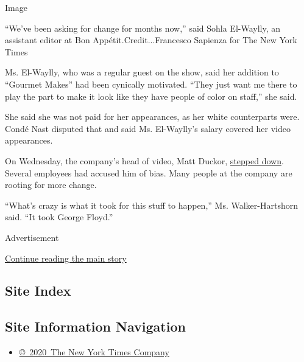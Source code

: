Image

``We've been asking for change for months now,'' said Sohla El-Waylly,
an assistant editor at Bon Appétit.Credit...Francesco Sapienza for The
New York Times

Ms. El-Waylly, who was a regular guest on the show, said her addition to
``Gourmet Makes'' had been cynically motivated. ``They just want me
there to play the part to make it look like they have people of color on
staff,'' she said.

She said she was not paid for her appearances, as her white counterparts
were. Condé Nast disputed that and said Ms. El-Waylly's salary covered
her video appearances.

On Wednesday, the company's head of video, Matt Duckor,
\href{https://www.nytimes3xbfgragh.onion/2020/06/10/business/conde-nast-matt-duckor.html}{stepped
down}. Several employees had accused him of bias. Many people at the
company are rooting for more change.

``What's crazy is what it took for this stuff to happen,'' Ms.
Walker-Hartshorn said. ``It took George Floyd.''

Advertisement

\protect\hyperlink{after-bottom}{Continue reading the main story}

\hypertarget{site-index}{%
\subsection{Site Index}\label{site-index}}

\hypertarget{site-information-navigation}{%
\subsection{Site Information
Navigation}\label{site-information-navigation}}

\begin{itemize}
\tightlist
\item
  \href{https://help.nytimes3xbfgragh.onion/hc/en-us/articles/115014792127-Copyright-notice}{©~2020~The
  New York Times Company}
\end{itemize}

